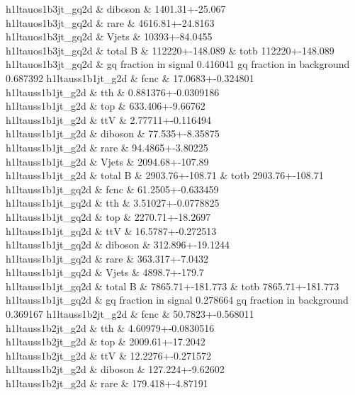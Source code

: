 h1ltauos1b3jt_gq2d \& diboson \& 1401.31+-25.067 \\
h1ltauos1b3jt_gq2d \& rare \& 4616.81+-24.8163 \\
h1ltauos1b3jt_gq2d \& Vjets \& 10393+-84.0455 \\
h1ltauos1b3jt_gq2d \&  total B  \& 112220+-148.089 \&  totb 112220+-148.089 \\
h1ltauos1b3jt_gq2d \&  gq fraction in signal 0.416041 gq fraction in background 0.687392
h1ltauss1b1jt_g2d \& fcnc \& 17.0683+-0.324801 \\
h1ltauss1b1jt_g2d \& tth \& 0.881376+-0.0309186 \\
h1ltauss1b1jt_g2d \& top \& 633.406+-9.66762 \\
h1ltauss1b1jt_g2d \& ttV \& 2.77711+-0.116494 \\
h1ltauss1b1jt_g2d \& diboson \& 77.535+-8.35875 \\
h1ltauss1b1jt_g2d \& rare \& 94.4865+-3.80225 \\
h1ltauss1b1jt_g2d \& Vjets \& 2094.68+-107.89 \\
h1ltauss1b1jt_g2d \&  total B  \& 2903.76+-108.71 \&  totb 2903.76+-108.71 \\
h1ltauss1b1jt_gq2d \& fcnc \& 61.2505+-0.633459 \\
h1ltauss1b1jt_gq2d \& tth \& 3.51027+-0.0778825 \\
h1ltauss1b1jt_gq2d \& top \& 2270.71+-18.2697 \\
h1ltauss1b1jt_gq2d \& ttV \& 16.5787+-0.272513 \\
h1ltauss1b1jt_gq2d \& diboson \& 312.896+-19.1244 \\
h1ltauss1b1jt_gq2d \& rare \& 363.317+-7.0432 \\
h1ltauss1b1jt_gq2d \& Vjets \& 4898.7+-179.7 \\
h1ltauss1b1jt_gq2d \&  total B  \& 7865.71+-181.773 \&  totb 7865.71+-181.773 \\
h1ltauss1b1jt_gq2d \&  gq fraction in signal 0.278664 gq fraction in background 0.369167
h1ltauss1b2jt_g2d \& fcnc \& 50.7823+-0.568011 \\
h1ltauss1b2jt_g2d \& tth \& 4.60979+-0.0830516 \\
h1ltauss1b2jt_g2d \& top \& 2009.61+-17.2042 \\
h1ltauss1b2jt_g2d \& ttV \& 12.2276+-0.271572 \\
h1ltauss1b2jt_g2d \& diboson \& 127.224+-9.62602 \\
h1ltauss1b2jt_g2d \& rare \& 179.418+-4.87191 \\
